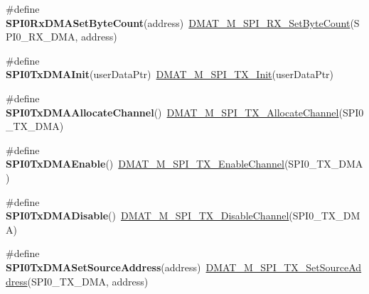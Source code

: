 \begin{DoxyCompactItemize}
\item 
\hypertarget{group___func_ala_ga7cbf6a762fd3bc92940919fec3c505f1}{\#define {\bfseries S\-P\-I0\-Rx\-D\-M\-A\-Set\-Byte\-Count}(address)~\hyperlink{group___d_m_a_t___m___s_p_i___r_x__module_ga060c809d41d04bdf1d7b974bf4b61730}{D\-M\-A\-T\-\_\-\-M\-\_\-\-S\-P\-I\-\_\-\-R\-X\-\_\-\-Set\-Byte\-Count}(S\-P\-I0\-\_\-\-R\-X\-\_\-\-D\-M\-A, address)}\label{group___func_ala_ga7cbf6a762fd3bc92940919fec3c505f1}

\item 
\hypertarget{group___func_ala_ga05181a90fb826df981000d37bbabe90c}{\#define {\bfseries S\-P\-I0\-Tx\-D\-M\-A\-Init}(user\-Data\-Ptr)~\hyperlink{group___d_m_a_t___m___s_p_i___t_x__module_ga95c3704b8d48c499e7a75f797cf5a3e4}{D\-M\-A\-T\-\_\-\-M\-\_\-\-S\-P\-I\-\_\-\-T\-X\-\_\-\-Init}(user\-Data\-Ptr)}\label{group___func_ala_ga05181a90fb826df981000d37bbabe90c}

\item 
\hypertarget{group___func_ala_ga47bb88ea35105c03a8a3c5b1096b7313}{\#define {\bfseries S\-P\-I0\-Tx\-D\-M\-A\-Allocate\-Channel}()~\hyperlink{group___d_m_a_t___m___s_p_i___t_x__module_ga776adbfbb06d8b0cf147b086f875616f}{D\-M\-A\-T\-\_\-\-M\-\_\-\-S\-P\-I\-\_\-\-T\-X\-\_\-\-Allocate\-Channel}(S\-P\-I0\-\_\-\-T\-X\-\_\-\-D\-M\-A)}\label{group___func_ala_ga47bb88ea35105c03a8a3c5b1096b7313}

\item 
\hypertarget{group___func_ala_ga63d30f060af0917a27dec219c43aeee2}{\#define {\bfseries S\-P\-I0\-Tx\-D\-M\-A\-Enable}()~\hyperlink{group___d_m_a_t___m___s_p_i___t_x__module_ga7c78e2312b7dea13bafe530139deec3c}{D\-M\-A\-T\-\_\-\-M\-\_\-\-S\-P\-I\-\_\-\-T\-X\-\_\-\-Enable\-Channel}(S\-P\-I0\-\_\-\-T\-X\-\_\-\-D\-M\-A)}\label{group___func_ala_ga63d30f060af0917a27dec219c43aeee2}

\item 
\hypertarget{group___func_ala_ga246f57f0666fc021d2e53ec9ae046910}{\#define {\bfseries S\-P\-I0\-Tx\-D\-M\-A\-Disable}()~\hyperlink{group___d_m_a_t___m___s_p_i___t_x__module_gada4a924c19293a09528edcee718297cc}{D\-M\-A\-T\-\_\-\-M\-\_\-\-S\-P\-I\-\_\-\-T\-X\-\_\-\-Disable\-Channel}(S\-P\-I0\-\_\-\-T\-X\-\_\-\-D\-M\-A)}\label{group___func_ala_ga246f57f0666fc021d2e53ec9ae046910}

\item 
\hypertarget{group___func_ala_ga57544e0fea38d134f176fb326a182bfd}{\#define {\bfseries S\-P\-I0\-Tx\-D\-M\-A\-Set\-Source\-Address}(address)~\hyperlink{group___d_m_a_t___m___s_p_i___t_x__module_gaf2a9fc998d2ddfc4dbf775a58dd27beb}{D\-M\-A\-T\-\_\-\-M\-\_\-\-S\-P\-I\-\_\-\-T\-X\-\_\-\-Set\-Source\-Address}(S\-P\-I0\-\_\-\-T\-X\-\_\-\-D\-M\-A, address)}\label{group___func_ala_ga57544e0fea38d134f176fb326a182bfd}


\end{DoxyCompactItemize}
